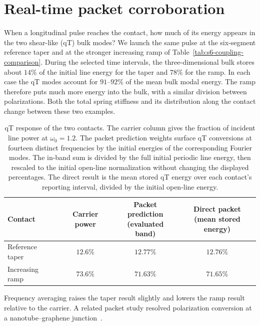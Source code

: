 \documentclass[10pt,aps,onecolumn,floatfix,notitlepage,nofootinbib,showkeys]{revtex4-2}
\begin{document}
\section{Real-time packet corroboration}
\label{sec:s7-direct}

When a longitudinal pulse reaches the contact, how much of its energy appears in the two shear-like (qT) bulk modes? We launch the same pulse at the six-segment reference taper and at the stronger increasing ramp of Table~\ref{tab:s6-coupling-comparison}. During the selected time intervals, the three-dimensional bulk stores about $14\%$ of the initial line energy for the taper and $78\%$ for the ramp. In each case the qT modes account for $91$--$92\%$ of the mean bulk modal energy. The ramp therefore puts much more energy into the bulk, with a similar division between polarizations. Both the total spring stiffness and its distribution along the contact change between these two examples.

\begin{table}[!ht]
 \centering
 \caption{qT response of the two contacts. The carrier column gives the fraction of incident line power at $\omega_0=1.2$. The packet prediction weights surface qT conversions at fourteen distinct frequencies by the initial energies of the corresponding Fourier modes. The in-band sum is divided by the full initial periodic line energy, then rescaled to the initial open-line normalization without changing the displayed percentages. The direct result is the mean stored qT energy over each contact's reporting interval, divided by the initial open-line energy.}
 \label{tab:s7-packet-comparison}
 \begin{ruledtabular}
 \begin{tabular}{lccc}
 Contact & Carrier power & \shortstack{Packet prediction\\(evaluated band)} & \shortstack{Direct packet\\(mean stored energy)}\\
 \hline
 Reference taper & $12.6\%$ & $12.77\%$ & $12.76\%$\\
 Increasing ramp & $73.6\%$ & $71.63\%$ & $71.65\%$\\
 \end{tabular}
 \end{ruledtabular}
\end{table}

Frequency averaging raises the taper result slightly and lowers the ramp result relative to the carrier. A related packet study resolved polarization conversion at a nanotube--graphene junction~\cite{Shi2018}.
\end{document}
